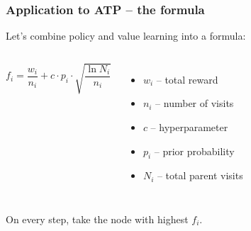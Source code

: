 \documentclass{beamer}
\begin{document}
\begin{frame}
    \frametitle{Application to ATP -- the formula}
    Let's combine policy and value learning into a formula:
    \begin{columns}
    \begin{equation*}
        f_i=\frac{w_i}{n_i}+c\cdot p_i \cdot \sqrt{\frac{\ln N_i}{n_i}}
    \end{equation*}
    \begin{itemize}
        \item \alert{$w_i$ -- total reward}
        \item $n_i$ -- number of visits
        \item $c$ -- hyperparameter
        \item \alert{$p_i$ -- prior probability}
        \item $N_i$ -- total parent visits
    \end{itemize}
    \end{columns}

    On every step, take the node with highest $f_i$.
\end{frame}
\end{document}
